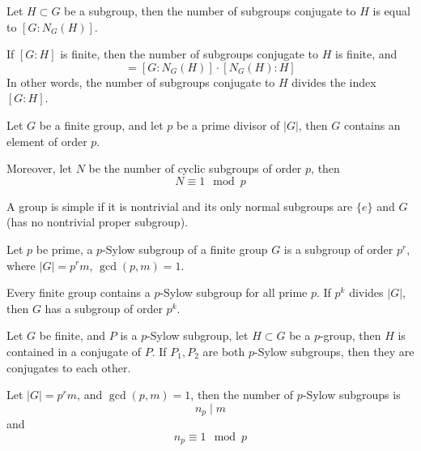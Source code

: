 \documentclass[openany]{book}
\begin{document}
\begin{prop}[*]
    Let $H\subset G$ be a subgroup, then the number of subgroups conjugate to $H$ is equal to $[G:N_G(H)]$.
\end{prop}
\begin{cor}
    If $[G:H]$ is finite, then the number of subgroups conjugate to $H$ is finite, and 
    \begin{equation*}
        [G:H]=[G:N_G(H)]\cdot[N_G(H): H]
    \end{equation*}
    In other words, the number of subgroups conjugate to $H$ divides the index $[G:H]$.
\end{cor}


\begin{thm}
    Let $G$ be a finite group, and let $p$ be a prime divisor of $|G|$, then $G$ contains an element of order $p$.

    Moreover, let $N$ be the number of cyclic subgroups of order $p$, then 
    \begin{equation*}
        N\equiv 1\mod p
    \end{equation*}
\end{thm}


\begin{defn}[simple]
    A group is simple if it is nontrivial and its only normal subgroups are $\{e\}$ and $G$ (has no nontrivial proper subgroup).
\end{defn}

\begin{defn}
    Let $p$ be prime, a $p$-Sylow subgroup of a finite group $G$ is a subgroup of order $p^r$, where $|G|=p^rm$, $\gcd(p,m)=1$. 
\end{defn}

\begin{thm}[Sylow I]
    Every finite group contains a $p$-Sylow subgroup for all prime $p$. If $p^k$ divides $|G|$, then $G$ has a subgroup of order $p^k$.
\end{thm}

\begin{thm}[Sylow II]
    Let $G$ be finite, and $P$ is a $p$-Sylow subgroup, let $H\subset G$ be a $p$-group, then $H$ is contained in a conjugate of $P$. If $P_1,P_2$ are both $p$-Sylow subgroups, then they are conjugates to each other.
\end{thm}

\begin{thm}
    Let $|G|=p^rm$, and $\gcd(p,m)=1$, then the number of $p$-Sylow subgroups is 
    \begin{equation*}
        n_p\mid m 
    \end{equation*}
    and 
    \begin{equation*}
        n_p\equiv 1\mod p
    \end{equation*}
\end{thm}
\end{document}
